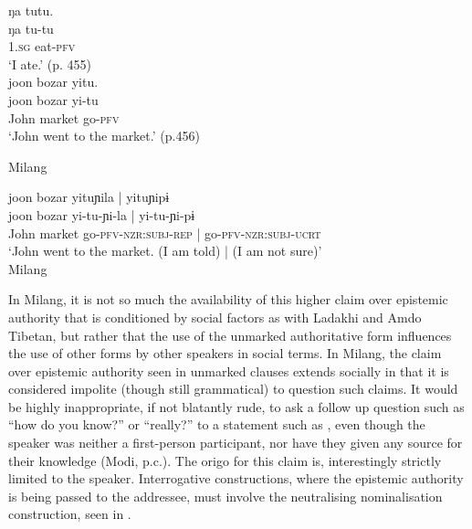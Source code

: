 \begin{exe}
    \ex\label{e:Discussion:MilangEgo}
    \begin{xlist}
        \ex \label{e:Discussion:MilangEgo1}
        \glll ŋa tutu. \\
        ŋa tu-tu \\
        1.\textsc{sg} eat-\textsc{pfv} \\
        \glt `I ate.' (p. 455) \\

        \ex \label{e:Discussion:MilangEgo2}
        \glll joon bozar yitu. \\
        joon bozar yi-tu \\
        John market go-\textsc{pfv} \\
        \glt `John went to the market.' (p.456) \\
    \end{xlist}
    Milang \cite[Siangic: India,][]{Modi2017}
\end{exe}
\begin{exe}
    \ex \label{e:Discussion:MilangNonEgo}
    \glll joon bozar yituɲila | yituɲipɨ \\
    joon bozar yi-tu-ɲi-la | yi-tu-ɲi-pɨ \\
    John market go-\textsc{pfv}-\textsc{nzr:subj}-\textsc{rep} | go-\textsc{pfv}-\textsc{nzr:subj}-\textsc{ucrt} \\
    \glt `John went to the market. (I am told) | (I am not sure)' \\
    Milang \cite[Siangic: India][457, given as two examples in source and combined here]{Modi2017}
\end{exe}

In Milang, it is not so much the availability of this higher claim over epistemic authority that is conditioned by social factors as with Ladakhi and Amdo Tibetan, but rather that the use of the unmarked authoritative form influences the use of other forms by other speakers in social terms. In Milang, the claim over epistemic authority seen in unmarked clauses extends socially in that it is considered impolite (though still grammatical) to question such claims. It would be highly inappropriate, if not blatantly rude, to ask a follow up question such as ``how do you know?'' or ``really?'' to a statement such as , even though the speaker was neither a first-person participant, nor have they given any source for their knowledge (Modi, p.c.). The origo for this claim is, interestingly strictly limited to the speaker. Interrogative constructions, where the epistemic authority is being passed to the addressee, must involve the neutralising nominalisation construction, seen in  \cite[457]{Modi2017}.

